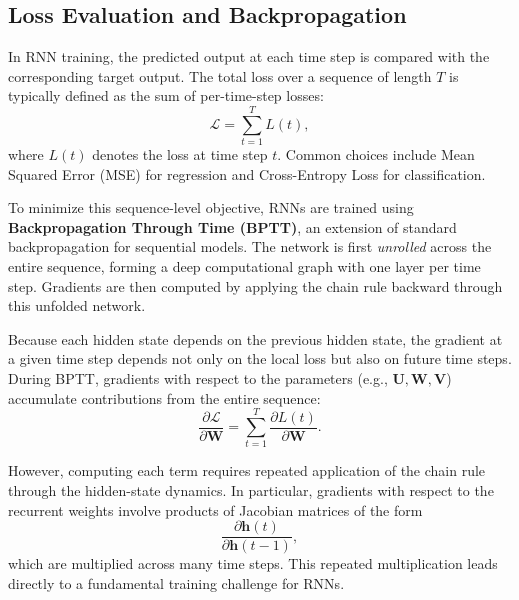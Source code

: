 \documentclass{article}
\begin{document}



\subsection{Loss Evaluation and Backpropagation}

In RNN training, the predicted output at each time step is compared with the corresponding target output. The total loss over a sequence of length \(T\) is typically defined as the sum of per-time-step losses:
\[
\mathcal{L} = \sum_{t=1}^{T} L(t),
\]
where \(L(t)\) denotes the loss at time step \(t\). Common choices include Mean Squared Error (MSE) for regression and Cross-Entropy Loss for classification.

To minimize this sequence-level objective, RNNs are trained using \textbf{Backpropagation Through Time (BPTT)}, an extension of standard backpropagation for sequential models. The network is first \emph{unrolled} across the entire sequence, forming a deep computational graph with one layer per time step. Gradients are then computed by applying the chain rule backward through this unfolded network.

Because each hidden state depends on the previous hidden state, the gradient at a given time step depends not only on the local loss but also on future time steps. During BPTT, gradients with respect to the parameters (e.g., \( \mathbf{U}, \mathbf{W}, \mathbf{V} \)) accumulate contributions from the entire sequence:
\[
\frac{\partial \mathcal{L}}{\partial \mathbf{W}} 
= \sum_{t=1}^{T} \frac{\partial L(t)}{\partial \mathbf{W}}.
\]

However, computing each term requires repeated application of the chain rule through the hidden-state dynamics. In particular, gradients with respect to the recurrent weights involve products of Jacobian matrices of the form
\[
\frac{\partial \mathbf{h}(t)}{\partial \mathbf{h}(t-1)},
\]
which are multiplied across many time steps. This repeated multiplication leads directly to a fundamental training challenge for RNNs.
\end{document}
